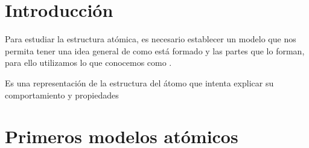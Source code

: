 

\section{Introducción}
Para estudiar la estructura atómica, es necesario establecer un modelo que nos permita tener una idea general de como está formado y las partes que lo forman, para ello utilizamos lo que conocemos como .
\vspace{6pt}
\begin{definition}
    Es una representación de la estructura del átomo que intenta explicar su comportamiento y propiedades
\end{definition}


\section{Primeros modelos atómicos}

